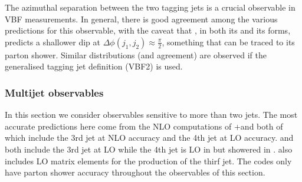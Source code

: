 The azimuthal separation between the two tagging jets is a crucial
observable in VBF measurements. In general, there is good agreement 
among the various predictions for this observable, with the caveat
that \Sherpa, in both its \NNLOPS and its \MEPSatNLO forms, predicts a
shallower dip at $\Delta\phi(j_1,j_2)\approx\tfrac{\pi}{2}$, something
that can be traced to its parton shower. Similar distributions (and
agreement) are observed if the generalised tagging jet definition
(VBF2) is used.




\subsubsection{Multijet observables}
\label{sec:hjetscomp:results:mjobs}

In this section we consider observables sensitive to more than two jets.
The most accurate predictions here come from the NLO computations of 
\GoSam{}+\Sherpa and \Sherpa \MEPSatNLO both of which include the 3rd 
jet at NLO accuracy and the 4th jet at LO accuracy. \MGaMC and \Herwig 
both include the 3rd jet at LO while the 4th jet is LO in \Herwig but 
showered in \MGaMC. \Hej also includes LO matrix elements for the production 
of the thirf jet. The \NNLOPS codes only have parton shower accuracy 
throughout the observables of this section.


